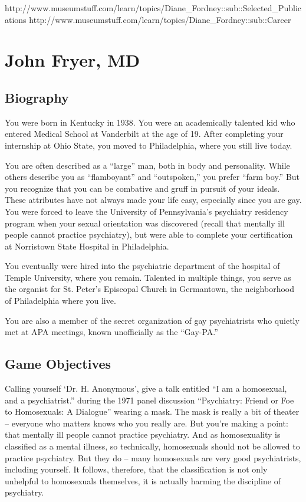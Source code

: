 http:\slash \slash www.museumstuff.com\slash learn\slash topics\slash Diane\_Fordney::sub::Selected\_Publications
http:\slash \slash www.museumstuff.com\slash learn\slash topics\slash Diane\_Fordney::sub::Career

\chapter{John Fryer, MD}
\label{johnfryermd}

\section{Biography}
\label{biography}

You were born in Kentucky in 1938. You were an academically talented kid who entered Medical School at Vanderbilt at the age of 19. After completing your internship at Ohio State, you moved to Philadelphia, where you still live today.

You are often described as a ``large'' man, both in body and personality. While others describe you as ``flamboyant'' and ``outspoken,'' you prefer ``farm boy.'' But you recognize that you can be combative and gruff in pursuit of your ideals. These attributes have not always made your life easy, especially since you are gay. You were forced to leave the University of Pennsylvania's psychiatry residency program when your sexual orientation was discovered (recall that mentally ill people cannot practice psychiatry), but were able to complete your certification at Norristown State Hospital in Philadelphia.

You eventually were hired into the psychiatric department of the hospital of Temple University, where you remain. Talented in multiple things, you serve as the organist for St. Peter's Episcopal Church in Germantown, the neighborhood of Philadelphia where you live.

You are also a member of the secret organization of gay psychiatrists who quietly met at APA meetings, known unofficially as the ``Gay-PA.''

\section{Game Objectives}
\label{gameobjectives}

Calling yourself `Dr. H. Anonymous', give a talk entitled ``I am a homosexual, and a psychiatrist.'' during the 1971 panel discussion ``Psychiatry: Friend or Foe to Homosexuals: A Dialogue'' wearing a mask. The mask is really a bit of theater – everyone who matters knows who you really are. But you're making a point: that mentally ill people cannot practice psychiatry. And as homosexuality is classified as a mental illness, so technically, homosexuals should not be allowed to practice psychiatry. But they do – many homosexuals are very good psychiatrists, including yourself. It follows, therefore, that the classification is not only unhelpful to homosexuals themselves, it is actually harming the discipline of psychiatry.

